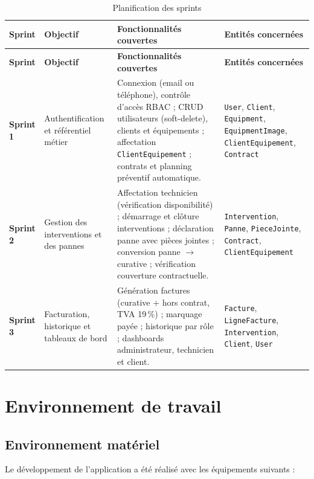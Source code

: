 \begin{longtable}{|p{1.7cm}|p{3.2cm}|p{5.8cm}|p{4cm}|}
\caption{Planification des sprints}
\label{tab:ch2:sprints} \\
\hline
\textbf{Sprint} & \textbf{Objectif} & \textbf{Fonctionnalités couvertes} & \textbf{Entités concernées} \\
\hline
\endfirsthead
\hline
\textbf{Sprint} & \textbf{Objectif} & \textbf{Fonctionnalités couvertes} & \textbf{Entités concernées} \\
\hline
\endhead
\hline
\endfoot
\hline
\endlastfoot
\textbf{Sprint 1}
  & Authentification et référentiel métier
  & Connexion (email ou téléphone), contrôle d'accès RBAC ;
    CRUD utilisateurs (soft-delete), clients et équipements ;
    affectation \texttt{ClientEquipement} ; contrats et planning préventif automatique.
  & \texttt{User}, \texttt{Client}, \texttt{Equipment},
    \texttt{EquipmentImage}, \texttt{ClientEquipement},
    \texttt{Contract} \\
\hline
\textbf{Sprint 2}
  & Gestion des interventions et des pannes
  & Affectation technicien (vérification disponibilité) ;
    démarrage et clôture interventions ;
    déclaration panne avec pièces jointes ;
    conversion panne $\rightarrow$ curative ; vérification couverture contractuelle.
  & \texttt{Intervention}, \texttt{Panne}, \texttt{PieceJointe},
    \texttt{Contract}, \texttt{ClientEquipement} \\
\hline
\textbf{Sprint 3}
  & Facturation, historique et tableaux de bord
  & Génération factures (curative + hors contrat, TVA 19\,\%) ;
    marquage payée ; historique par rôle ;
    dashboards administrateur, technicien et client.
  & \texttt{Facture}, \texttt{LigneFacture}, \texttt{Intervention},
    \texttt{Client}, \texttt{User} \\
\hline
\end{longtable}

\section{Environnement de travail}

\subsection{Environnement matériel}

Le développement de l'application a été réalisé avec les équipements suivants :

